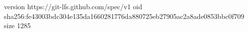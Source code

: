 version https://git-lfs.github.com/spec/v1
oid sha256:fe43003bdc304e135da1660281776da880725eb27905ac2a8ade0853bbc0f709
size 1285
